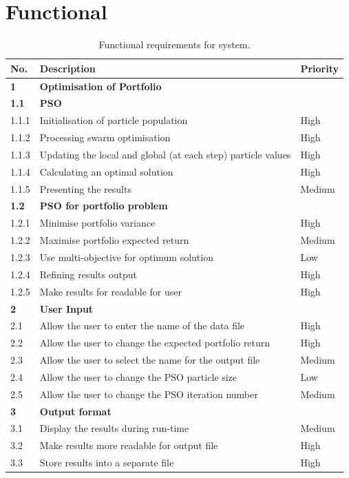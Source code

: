 \documentclass{pdfmx4020}
\begin{document}
  \section{Functional} %
  \label{sec:functional}
  \begin{table}[ht]
    \setlength{\extrarowheight}{2.0pt}
    \begin{tabular}{|l|l|l|}
      \hline
      No. & Description & Priority \\
      \hline
      \textbf{1} & \textbf{Optimisation of Portfolio} & \\
      \hline 
      \textbf{1.1} & \textbf{PSO} & \\
      \hline 
      1.1.1 & Initialisation of particle population & High \\
      \hline 
      1.1.2 & Processing swarm optimisation & High \\
      \hline 
      1.1.3 & Updating the local and global (at each step) particle values & High \\
      \hline 
      1.1.4 & Calculating an optimal solution & High \\
      \hline 
      1.1.5 & Presenting the results & Medium \\
      \hline 
      \textbf{1.2} & \textbf{PSO for portfolio problem } & \\
      \hline 
      1.2.1 & Minimise portfolio variance & High \\
      \hline 
      1.2.2 & Maximise portfolio expected return & Medium \\
      \hline 
      1.2.3 & Use multi-objective for optimum solution & Low \\
      \hline 
      1.2.4 & Refining results output & High \\
      \hline 
      1.2.5 & Make results for readable for user & High \\
      \hline 
      \textbf{2} & \textbf{User Input} & \\
      \hline
      2.1 & Allow the user to enter the name of the data file & High \\
      \hline
      2.2 & Allow the user to change the expected portfolio return & High \\
      \hline 
      2.3 & Allow the user to select the name for the output file & Medium \\
      \hline 
      2.4 & Allow the user to change the PSO particle size & Low \\
      \hline 
      2.5 & Allow the user to change the PSO iteration number & Medium \\
      \hline
      \textbf{3} &\textbf{Output format} & \\
      \hline 
      3.1 & Display the results during run-time & Medium \\
      \hline 
      3.2 & Make results more readable for output file & High \\
      \hline
      3.3 & Store results into a separate file & High \\
      \hline
    \end{tabular}
    \caption{Functional requirements for system.}
    \label{table:functionalRequirements}
  \end{table}
\end{document}
